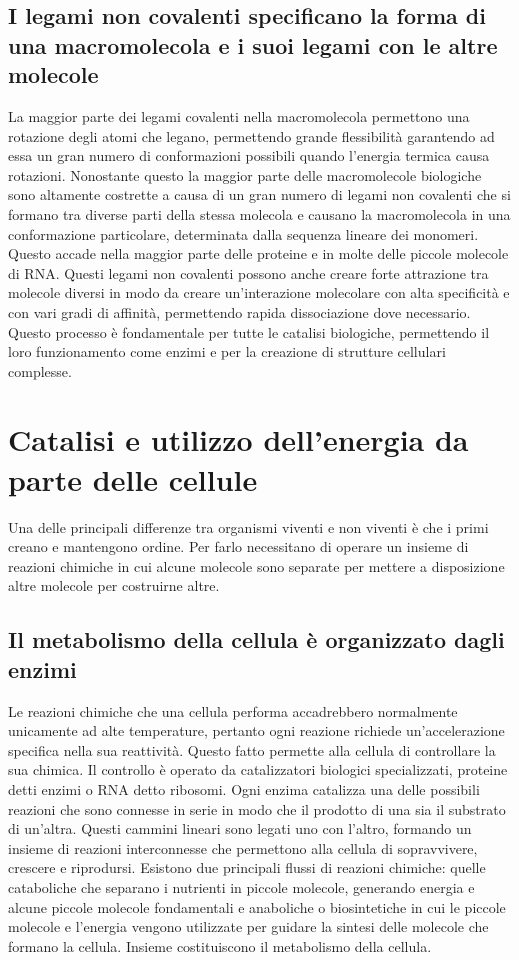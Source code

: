 \subsection{I legami non covalenti specificano la forma di una macromolecola e i suoi legami con le altre molecole}
La maggior parte dei legami covalenti nella macromolecola permettono una rotazione degli atomi che legano, permettendo grande flessibilit\`a garantendo ad essa un gran numero di 
conformazioni possibili quando l'energia termica causa rotazioni. Nonostante questo la maggior parte delle macromolecole biologiche sono altamente costrette a causa di un gran numero di
legami non covalenti che si formano tra diverse parti della stessa molecola e causano la macromolecola in una conformazione particolare, determinata dalla sequenza lineare dei monomeri.
Questo accade nella maggior parte delle proteine e in molte delle piccole molecole di RNA. Questi legami non covalenti possono anche creare forte attrazione tra molecole diversi in modo
da creare un'interazione molecolare con alta specificit\`a e con vari gradi di affinit\`a, permettendo rapida dissociazione dove necessario. Questo processo \`e fondamentale per tutte le
catalisi biologiche, permettendo il loro funzionamento come enzimi e per la creazione di strutture cellulari complesse. 
\section{Catalisi e utilizzo dell'energia da parte delle cellule}
Una delle principali differenze tra organismi viventi e non viventi \`e che i primi creano e mantengono ordine. Per farlo necessitano di operare un insieme di reazioni chimiche in cui 
alcune molecole sono separate per mettere a disposizione altre molecole per costruirne altre.
\subsection{Il metabolismo della cellula \`e organizzato dagli enzimi}
Le reazioni chimiche che una cellula performa accadrebbero normalmente unicamente ad alte temperature, pertanto ogni reazione richiede un'accelerazione specifica nella sua reattivit\`a.
Questo fatto permette alla cellula di controllare la sua chimica. Il controllo \`e operato da catalizzatori biologici specializzati, proteine detti enzimi o RNA detto ribosomi. Ogni
enzima catalizza una delle possibili reazioni che sono connesse in serie in modo che il prodotto di una sia il substrato di un'altra. Questi cammini lineari sono legati uno con l'altro,
formando un insieme di reazioni interconnesse che permettono alla cellula di sopravvivere, crescere e riprodursi. Esistono due principali flussi di reazioni chimiche: quelle cataboliche
che separano i nutrienti in piccole molecole, generando energia e alcune  piccole molecole fondamentali e anaboliche o biosintetiche in cui le piccole molecole e l'energia vengono
utilizzate per guidare la sintesi delle molecole che formano la cellula. Insieme costituiscono il metabolismo della cellula. 
